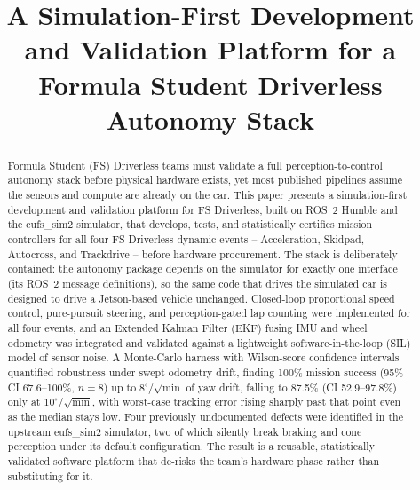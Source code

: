 \documentclass[conference]{IEEEtran}
\begin{document}
\title{A Simulation-First Development and Validation Platform for a Formula Student Driverless Autonomy Stack}

\author{
\and
{}
}

\maketitle

\begin{abstract}
Formula Student (FS) Driverless teams must validate a full perception-to-control autonomy stack before physical hardware exists, yet most published pipelines assume the sensors and compute are already on the car. This paper presents a simulation-first development and validation platform for FS Driverless, built on ROS~2 Humble and the eufs\_sim2 simulator, that develops, tests, and statistically certifies mission controllers for all four FS Driverless dynamic events -- Acceleration, Skidpad, Autocross, and Trackdrive -- before hardware procurement. The stack is deliberately contained: the autonomy package depends on the simulator for exactly one interface (its ROS~2 message definitions), so the same code that drives the simulated car is designed to drive a Jetson-based vehicle unchanged. Closed-loop proportional speed control, pure-pursuit steering, and perception-gated lap counting were implemented for all four events, and an Extended Kalman Filter (EKF) fusing IMU and wheel odometry was integrated and validated against a lightweight software-in-the-loop (SIL) model of sensor noise. A Monte-Carlo harness with Wilson-score confidence intervals quantified robustness under swept odometry drift, finding 100\% mission success (95\% CI 67.6--100\%, $n{=}8$) up to $8^{\circ}/\sqrt{\text{min}}$ of yaw drift, falling to 87.5\% (CI 52.9--97.8\%) only at $10^{\circ}/\sqrt{\text{min}}$, with worst-case tracking error rising sharply past that point even as the median stays low. Four previously undocumented defects were identified in the upstream eufs\_sim2 simulator, two of which silently break braking and cone perception under its default configuration. The result is a reusable, statistically validated software platform that de-risks the team's hardware phase rather than substituting for it.
\end{abstract}
\end{document}
